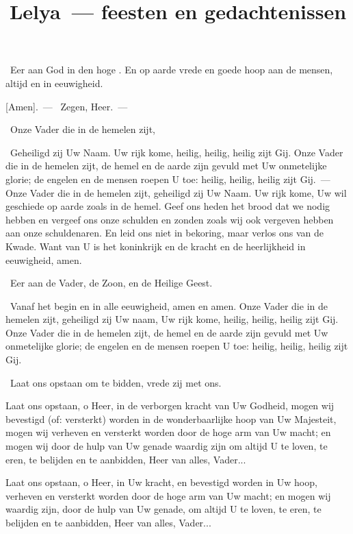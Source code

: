 \documentclass[12pt,twoside,a5paper]{article}
\begin{document}
\title{Lelya~--- feesten en gedachtenissen}
\author{}
\date{}
\maketitle

\footnotelayout{\ }


\begin{halfparskip}
  \cc~Eer aan God in den hoge . En op aarde vrede en goede hoop aan de mensen, altijd en in eeuwigheid.

  [Amen].~--- \rr~Zegen, Heer.~--- 

  \cc~Onze Vader die in de hemelen zijt,

  \rr~Geheiligd zij Uw Naam. Uw rijk kome, heilig, heilig, heilig zijt Gij. Onze Vader die in de hemelen zijt, de hemel en de aarde zijn gevuld met Uw onmetelijke glorie; de engelen en de mensen roepen U toe: heilig, heilig, heilig zijt Gij.~--- Onze Vader die in de hemelen zijt, geheiligd zij Uw Naam. Uw rijk kome, Uw wil geschiede op aarde zoals in de hemel. Geef ons heden het brood dat we nodig hebben en vergeef ons onze schulden en zonden zoals wij ook vergeven hebben aan onze schuldenaren. En leid ons niet in bekoring, maar verlos ons van de Kwade. Want van U is het koninkrijk en de kracht en de heerlijkheid in eeuwigheid, amen.

  \cc~Eer aan de Vader, de Zoon, en de Heilige Geest.

  \rr~Vanaf het begin en in alle eeuwigheid, amen en amen. Onze Vader die in de hemelen zijt, geheiligd zij Uw naam, Uw rijk kome, heilig, heilig, heilig zijt Gij. Onze Vader die in de hemelen zijt, de hemel en de aarde zijn gevuld met Uw onmetelijke glorie; de engelen en de mensen roepen U toe: heilig, heilig, heilig zijt Gij.

  \dd~Laat ons opstaan om te bidden, vrede zij met ons.

   Laat ons opstaan, o Heer, in de verborgen kracht van Uw Godheid, mogen wij bevestigd (of: versterkt) worden in de wonderbaarlijke hoop van Uw Majesteit, mogen wij verheven en versterkt worden door de hoge arm van Uw macht; en mogen wij door de hulp van Uw genade waardig zijn om altijd U te loven, te eren, te belijden en te aanbidden, Heer van alles, Vader...

   Laat ons opstaan, o Heer, in Uw kracht, en bevestigd worden in Uw hoop, verheven en versterkt worden door de hoge arm van Uw macht; en mogen wij waardig zijn, door de hulp van Uw genade, om altijd U te loven, te eren, te belijden en te aanbidden, Heer van alles, Vader...

\end{halfparskip}
\end{document}

